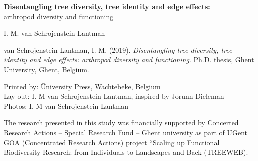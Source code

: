 \documentclass[b5paper,10pt]{book} %
\begin{document}
	
\clearpage
	
	\onehalfspace
	
	\frontmatter
	\pagestyle{frontmatter}
	\lstset{language=Perl}
	\begin{titlepage}
		
		\begin{center}	
			
			\thispagestyle{empty}
			
			\vspace*{3.00cm}
			
			{\Huge \textbf{Disentangling tree diversity, tree identity and edge effects:}}\\
			\vspace{1.0 cm}
			{\Huge arthropod diversity and functioning}
			
			
			\vspace{7.0 cm}
			
		\end{center}
		

		
	\end{titlepage}

\newpage
		
	\color{black}
	\newpage 
	\thispagestyle{empty}

	\vspace*{\fill}

	\begin{small}

	 I. M. van Schrojenstein Lantman

	\vspace{0.5cm}	

	van Schrojenstein Lantman, I. M. (2019). \textit{Disentangling tree diversity, tree identity and edge effects: arthropod diversity and functioning}. Ph.D. thesis, Ghent University, Ghent, Belgium.

	\vspace{0.5cm}	
\begin{tabbing}
 Printed by: \= University Press, Wachtebeke, Belgium  \\
Lay-out: \> I. M van Schrojenstein Lantman, inspired by Jorunn Dieleman \\
Photos: \> I. M van Schrojenstein Lantman
\end{tabbing}

	\vspace*{0.5cm}
	
	The research presented in this study was financially supported by Concerted Research Actions -- Special Research Fund -- Ghent university as part of UGent GOA (Concentrated Research Actions) project “Scaling up Functional Biodiversity Research: from Individuals to Landscapes and Back (TREEWEB).
	
	\vspace{1cm}
\end{small}	
\end{document}
